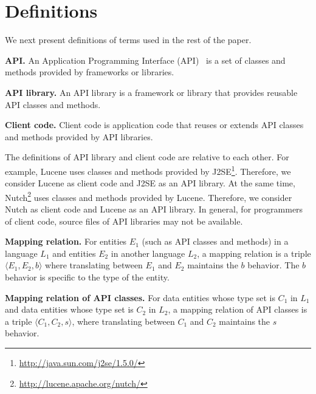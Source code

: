 \section{Definitions}
\label{sec:mapping}

We next present definitions of terms used in the rest of the paper.

\textbf{API.} An Application Programming Interface (API)~\cite{orenstein2000quickstudy}
is a set of classes and methods provided by frameworks or libraries.

\textbf{API library.} An API library is a framework
or library that provides reusable API classes and methods.

\textbf{Client code.} Client code is application code
that reuses or extends API classes and methods provided by API
libraries.

The definitions of API library and client code are
relative to each other. For example, Lucene uses classes and methods provided by
J2SE\footnote{\url{http://java.sun.com/j2se/1.5.0/}}. Therefore, we consider Lucene as client code and J2SE as an API library. At the same time, Nutch\footnote{\url{http://lucene.apache.org/nutch/}} uses classes and methods provided by Lucene. Therefore, we consider Nutch as client code and Lucene as an API library. In
general, for programmers of client code, source files of API libraries may not be available.

\textbf{Mapping relation.} For entities $E_1$ (such as API classes and methods) in a
language $L_1$ and entities $E_2$ in another
language $L_2$, a mapping relation is a triple $\langle E_1, E_2,
b \rangle$ where translating between $E_1$ and $E_2$ maintains the $b$ behavior.
The $b$ behavior is specific to the type of the entity.

%

\textbf{Mapping relation of API classes.} For data entities whose type set is $C_1$ in $L_1$ and data entities whose type set is $C_2$ in
$L_2$, a mapping relation of API classes is a triple
$\langle C_1, C_2, s \rangle$, where translating between $C_1$ and $C_2$ maintains the $s$ behavior.

